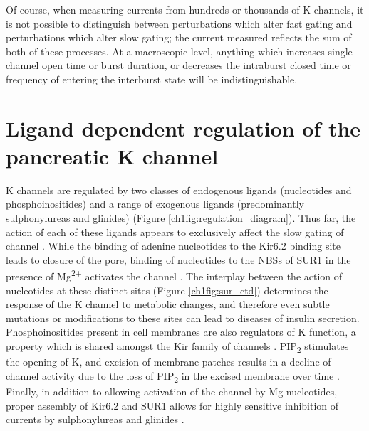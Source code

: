 Of course, when measuring currents from hundreds or thousands of K\ATP{} channels, it is not possible to distinguish between perturbations which alter fast gating and perturbations which alter slow gating; the current measured reflects the sum of both of these processes.
At a macroscopic level, anything which increases single channel open time or burst duration, or decreases the intraburst closed time or frequency of entering the interburst state will be indistinguishable.

\section{Ligand dependent regulation of the pancreatic K\ATP{} channel}

K\ATP{} channels are regulated by two classes of endogenous ligands (nucleotides and phosphoinositides) and a range of exogenous ligands (predominantly sulphonylureas and glinides) (Figure \ref{ch1fig:regulation_diagram}).
Thus far, the action of each of these ligands appears to exclusively affect the slow gating of channel \cite{proks_modeling_2009}.
While the binding of adenine nucleotides to the Kir6.2 binding site leads to closure of the pore, binding of nucleotides to the NBSs of SUR1 in the presence of Mg\textsuperscript{2+} activates the channel \cite{nichols_adenosine_1996-1, vedovato_nucleotide-binding_2015}.
The interplay between the action of nucleotides at these distinct sites (Figure \ref{ch1fig:sur_ctd}) determines the response of the K\ATP{} channel to metabolic changes, and therefore even subtle mutations or modifications to these sites can lead to diseases of insulin secretion.
Phosphoinositides present in cell membranes are also regulators of K\ATP{} function, a property which is shared amongst the Kir family of channels \cite{fan_anionic_1997, nichols_k_2006, hibino_inwardly_2010}.
PIP\textsubscript{2} stimulates the opening of K\ATP{}, and excision of membrane patches results in a decline of channel activity due to the loss of PIP\textsubscript{2} in the excised membrane over time \cite{proks_running_2016-2}.
Finally, in addition to allowing activation of the channel by Mg-nucleotides, proper assembly of Kir6.2 and SUR1 allows for highly sensitive inhibition of currents by sulphonylureas and glinides \cite{gribble_interaction_1997, ashcroft_new_2010}.

